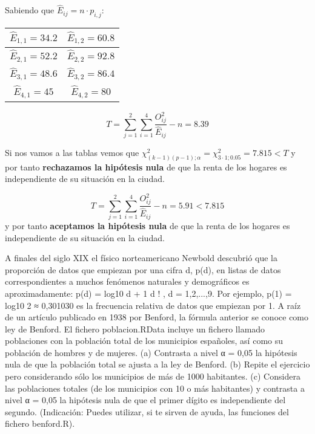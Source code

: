 \begin{problem}[8]
Sabiendo que $\hat{E}_{ij} = n·p_{i,j}$:

\begin{center}
	\begin{tabular}{c | c}
		$\hat{E}_{1,1} = 34.2$ & $\hat{E}_{1,2} = 60.8$\\ \hline
		$\hat{E}_{2,1} = 52.2$ & $\hat{E}_{2,2} = 92.8$\\ \hline
		$\hat{E}_{3,1} = 48.6$ & $\hat{E}_{3,2} = 86.4$\\ \hline
		$\hat{E}_{4,1} = 45$ & $\hat{E}_{4,2} = 80$
	\end{tabular}
\end{center}

\[T=\sum_{j=1}^2 \sum_{i=1}^4 \frac{O_{ij}^2}{\hat{E}_{ij}} - n = 8.39\]

Si nos vamos a las tablas vemos que $χ^2_{(k-1)(p-1); α} = χ^2_{3·1; 0.05} = 7.815 < T$ y por tanto \textbf{rechazamos la hipótesis nula} de que la renta de los hogares es independiente de su situación en la ciudad.

\[T=\sum_{j=1}^2 \sum_{i=1}^4 \frac{O_{ij}^2}{\hat{E}_{ij}} - n = 5.91 < 7.815\] y por tanto \textbf{aceptamos la hipótesis nula} de que la renta de los hogares es independiente de su situación en la ciudad.


\end{problem}
\begin{problem}[9] A finales del siglo XIX el físico norteamericano Newbold descubrió que la proporción de datos
que empiezan por una cifra d, p(d), en listas de datos correspondientes a muchos fenómenos
naturales y demográficos es aproximadamente:
p(d) = log10
d + 1
d
!
, d = 1,2,...,9.
Por ejemplo, p(1) = log10 2 ≈ 0,301030 es la frecuencia relativa de datos que empiezan por 1. A raíz
de un artículo publicado en 1938 por Benford, la fórmula anterior se conoce como ley de Benford.
El fichero poblacion.RData incluye un fichero llamado poblaciones con la población total de los
municipios españoles, así como su población de hombres y de mujeres.
(a) Contrasta a nivel α = 0,05 la hipótesis nula de que la población total se ajusta a la ley de Benford.
(b) Repite el ejercicio pero considerando sólo los municipios de más de 1000 habitantes.
(c) Considera las poblaciones totales (de los municipios con 10 o más habitantes) y contrasta a nivel
α = 0,05 la hipótesis nula de que el primer dígito es independiente del segundo.
(Indicación: Puedes utilizar, si te sirven de ayuda, las funciones del fichero benford.R).
\solution

\end{problem}
